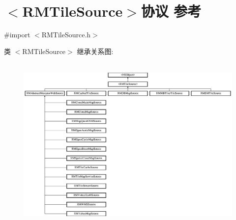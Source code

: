 \hypertarget{protocol_r_m_tile_source-p}{\section{$<$R\-M\-Tile\-Source$>$协议 参考}
\label{protocol_r_m_tile_source-p}
}


{\ttfamily \#import $<$R\-M\-Tile\-Source.\-h$>$}

类 $<$R\-M\-Tile\-Source$>$ 继承关系图\-:\begin{figure}[H]
\begin{center}
\leavevmode
\includegraphics[height=8.784314cm]{protocol_r_m_tile_source-p}
\end{center}
\end{figure}
